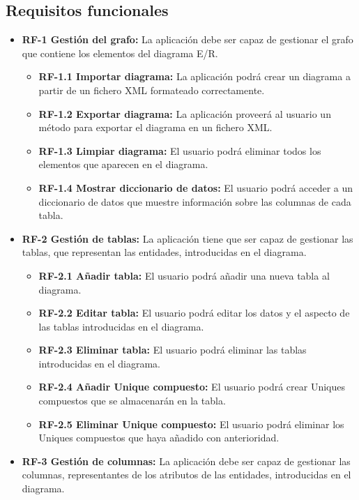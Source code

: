 \subsection{Requisitos funcionales}
\begin{itemize}
    \item \textbf{RF-1 Gestión del grafo: } La aplicación debe ser capaz de gestionar el grafo que contiene los elementos del diagrama E/R.
    \begin{itemize}
        \item \textbf{RF-1.1 Importar diagrama: }La aplicación podrá crear un diagrama a partir de un fichero XML formateado correctamente.
        \item \textbf{RF-1.2 Exportar diagrama: }La aplicación proveerá al usuario un método para exportar el diagrama en un fichero XML.
        \item \textbf{RF-1.3 Limpiar diagrama: }El usuario podrá eliminar todos los elementos que aparecen en el diagrama.
        \item \textbf{RF-1.4 Mostrar diccionario de datos: }El usuario podrá acceder a un diccionario de datos que muestre información sobre las columnas de cada tabla.
    \end{itemize}
    \item \textbf{RF-2 Gestión de tablas: }La aplicación tiene que ser capaz de gestionar las tablas, que representan las entidades, introducidas en el diagrama.
    \begin{itemize}
        \item \textbf{RF-2.1 Añadir tabla: }El usuario podrá añadir una nueva tabla al diagrama.
        \item \textbf{RF-2.2 Editar tabla: }El usuario podrá editar los datos y el aspecto de las tablas introducidas en el diagrama.
        \item \textbf{RF-2.3 Eliminar tabla: }El usuario podrá eliminar las tablas introducidas en el diagrama.
        \item \textbf{RF-2.4 Añadir Unique compuesto: }El usuario podrá crear Uniques compuestos que se almacenarán en la tabla.
        \item \textbf{RF-2.5 Eliminar Unique compuesto: }El usuario podrá eliminar los Uniques compuestos que haya añadido con anterioridad.
    \end{itemize}
    \item \textbf{RF-3 Gestión de columnas: }La aplicación debe ser capaz de gestionar las columnas, representantes de los atributos de las entidades, introducidas en el diagrama.

\end{itemize}
